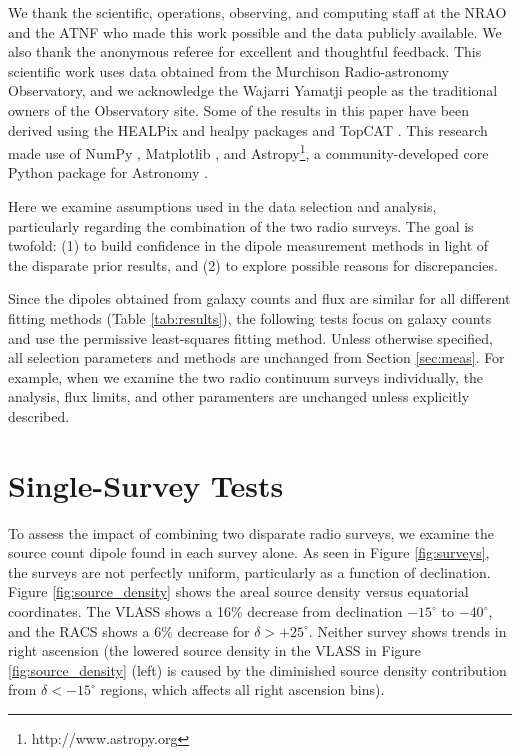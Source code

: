 \documentclass[twocolumn]{aastex63}
\begin{document}
\acknowledgments
We thank the scientific, operations, observing, and computing staff at the NRAO and the ATNF
  who made this work possible and the data publicly available.
  We also thank the anonymous referee for excellent and thoughtful feedback.
  This scientific work uses data obtained from the Murchison Radio-astronomy Observatory, and we acknowledge
  the Wajarri Yamatji people as the traditional owners of the Observatory site.
  Some of the results in this paper have been derived using the HEALPix and healpy packages \citep{healpix2005,healpy2019} and TopCAT \citep{topcat2005}.
  This research made use of NumPy \citep{NumPy}, Matplotlib \citep{Matplotlib}, and
  Astropy\footnote{http://www.astropy.org}, a community-developed core Python package for Astronomy \citep{astropy:2013, astropy:2018}.




  




\appendix

Here we examine assumptions used in the data selection and analysis, particularly regarding the combination of the two radio surveys.
The goal is twofold:
(1) to build confidence in the dipole measurement methods in light of the disparate prior results, and
(2) to explore possible reasons for discrepancies.  

Since the dipoles obtained from galaxy counts and flux are similar for all different fitting methods (Table \ref{tab:results}),
the following tests focus on galaxy counts and use the permissive least-squares fitting method.  Unless otherwise specified,
all selection parameters and methods are unchanged from Section \ref{sec:meas}.  For example, when we examine the two
radio continuum surveys individually, the analysis, flux limits, and other paramenters are unchanged unless explicitly described.  


\section{Single-Survey Tests}

To assess the impact of combining two disparate radio surveys, we examine the source count dipole found in each survey alone.
As seen in Figure \ref{fig:surveys}, the surveys are not perfectly uniform, particularly as a function of declination.  
Figure \ref{fig:source_density} shows the areal source density versus equatorial coordinates.  The
VLASS shows a 16\% decrease from declination $-15^\circ$  to $-40^\circ$, and the RACS shows
a 6\% decrease for $\delta > +25^\circ$.   Neither survey shows trends in right ascension (the lowered source density in
the VLASS in Figure \ref{fig:source_density} (left) is caused by the diminished source density contribution from $\delta < -15^\circ$
regions, which affects all right ascension bins).
\end{document}
